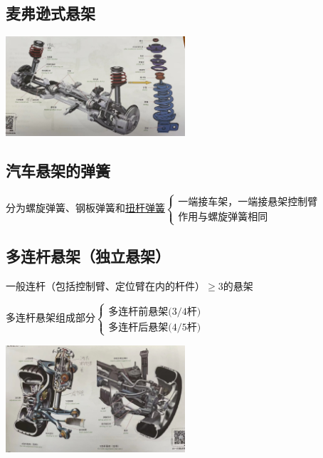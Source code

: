 		\subsection{麦弗逊式悬架}
			\begin{center}
				\includegraphics[width=0.5\textwidth]{3-24}
			\end{center}
		\subsection{汽车悬架的弹簧}
			分为螺旋弹簧、钢板弹簧和\underline{扭杆弹簧}$ \begin{cases}
				\text{一端接车架，一端接悬架控制臂} \\
				\text{作用与螺旋弹簧相同}
			\end{cases} $
		\subsection{多连杆悬架（独立悬架）}
			一般连杆（包括控制臂、定位臂在内的杆件）$ \ge $3的悬架
			
			多连杆悬架组成部分$ \begin{cases}
				\text{多连杆前悬架(3/4杆)} \\
				\text{多连杆后悬架(4/5杆)}
			\end{cases} $
			\begin{center}
				\includegraphics[width=0.5\textwidth]{3-25}
			\end{center}
